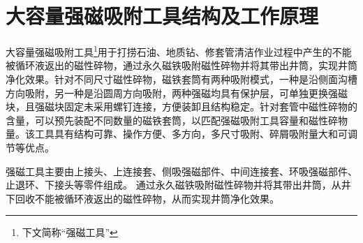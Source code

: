 \section{大容量强磁吸附工具结构及工作原理}
大容量强磁吸附工具\footnote{下文简称“强磁工具”}用于打捞石油、地质钻、修套管清洁作业过程中产生的不能被循环液返出的磁性碎物，通过永久磁铁吸附磁性碎物并将其带出井筒，实现井筒净化效果。针对不同尺寸磁性碎物，磁铁套筒有两种吸附模式，一种是沿侧面沟槽方向吸附，另一种是沿圆周方向吸附，两种强磁均具有保护层，可单独更换强磁块，且强磁块固定未采用螺钉连接，方便装卸且结构稳定。针对套管中磁性碎物的含量，可以预先装配不同数量的磁铁套筒，以匹配强磁吸附工具容量和磁性碎物量。该工具具有结构可靠、操作方便、多方向，多尺寸吸附、碎屑吸附量大和可调节等优点。

强磁工具主要由上接头、上连接套、侧吸强磁部件、中间连接套、环吸强磁部件、止退环、下接头等零件组成。
通过永久磁铁吸附磁性碎物并将其带出井筒，从井下回收不能被循环液返出的磁性碎物，从而实现井筒净化效果。


